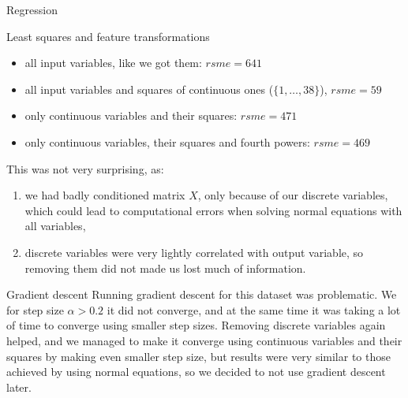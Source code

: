 \documentclass{article}
\begin{document}
\begin{section}{Regression}
\begin{subsection}{Least squares and feature transformations}
\begin{itemize}
\item all input variables, like we got them: $rsme=641$
\item all input variables and squares of continuous ones ($\{1, \ldots, 38\}$), $rsme = 59$
\item only continuous variables and their squares: $rsme = 471$
\item only continuous variables, their squares and fourth powers: $rsme = 469$
\end{itemize}
This was not very surprising, as:
\begin{enumerate}
\item we had badly conditioned matrix $X$, only because of our discrete variables, which could lead to computational errors when solving normal equations with all variables,
\item discrete variables were very lightly correlated with output variable, so removing them did not made us lost much of information.
\end{enumerate}
\end{subsection}
\begin{subsection}{Gradient descent}
Running gradient descent for this dataset was problematic. We for step size $\alpha > 0.2$ it did not converge, and at the same time it was taking a lot of time to converge using smaller step sizes. Removing discrete variables again helped, and we managed to make it converge using continuous variables and their squares by making even smaller step size, but results were very similar to those achieved by using normal equations, so we decided to not use gradient descent later.


\end{subsection}
\end{section}
\end{document}
